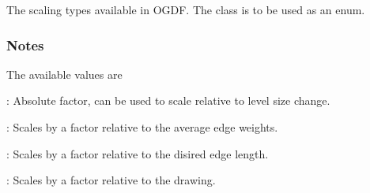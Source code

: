 \documentclass[letterpaper,10pt,english]{sphinxmanual}
\begin{document}

\begin{fulllineitems}
\label{\detokenize{documentation:tmap.ScalingType}}
The scaling types available in OGDF. The class is to be used as an enum.
\subsubsection*{Notes}

The available values are

: Absolute factor, can be used to scale relative to level size change.

: Scales by a factor relative to the average edge weights.

: Scales by a factor relative to the disired edge length.

: Scales by a factor relative to the drawing.

\end{fulllineitems}

\end{document}
